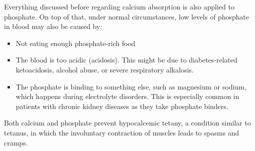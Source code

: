 Everything discussed before regarding calcium absorption is also applied to phosphate. On top of that, under normal circumstances, low levels of phosphate in blood may also be caused by:

\begin{itemize}

    \item Not eating enough phosphate-rich food
    
    \item The blood is too acidic (acidosis). This might be due to diabetes-related ketoacidosis, alcohol abuse, or severe respiratory alkalosis.
    
    \item The phosphate is binding to something else, such as magnesium or sodium, which happens during electrolyte disorders. This is especially common in patients with chronic kidney diseases as they take phosphate binders.
    
\end{itemize}

Both calcium and phosphate prevent hypocalcemic tetany, a condition similar to tetanus, in which the involuntary contraction of muscles leads to spasms and cramps.


